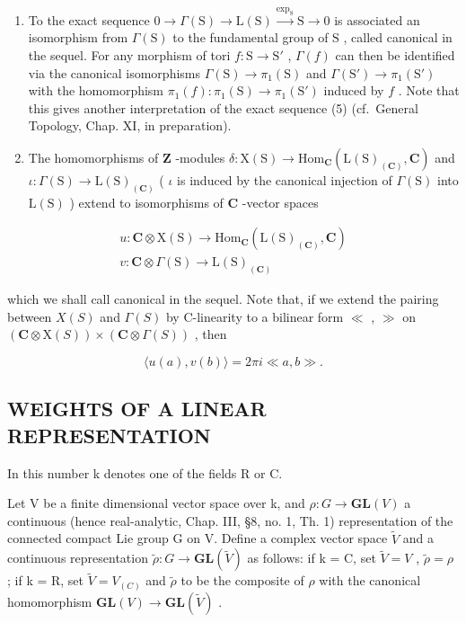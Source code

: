 \begin{enumerate}
\def\labelenumi{\arabic{enumi})}
\setcounter{enumi}{2}
\item
  To the exact sequence \(0 \to \Gamma(\mathrm{S}) \to \mathrm{L}(\mathrm{S}) \xrightarrow{\exp_{\mathrm{S}}} \mathrm{S} \to 0\) is associated an isomorphism from \(\Gamma(\mathrm{S})\) to the fundamental group of \(\mathrm{S}\) , called canonical in the sequel. For any morphism of tori \(f: \mathrm{S} \to \mathrm{S}'\) , \(\Gamma(f)\) can then be identified via the canonical isomorphisms \(\Gamma(\mathrm{S}) \to \pi_1(\mathrm{S})\) and \(\Gamma(\mathrm{S}') \to \pi_1(\mathrm{S}')\) with the homomorphism \(\pi_1(f): \pi_1(\mathrm{S}) \to \pi_1(\mathrm{S}')\) induced by \(f\) . Note that this gives another interpretation of the exact sequence (5) (cf.~General Topology, Chap. XI, in preparation).
\item
  The homomorphisms of \(\mathbf{Z}\) -modules \(\delta : \mathrm{X}(\mathrm{S}) \to \mathrm{Hom}_{\mathbf{C}}(\mathrm{L}(\mathrm{S})_{(\mathbf{C})}, \mathbf{C})\) and \(\iota : \Gamma(\mathrm{S}) \to \mathrm{L}(\mathrm{S})_{(\mathbf{C})}\) ( \(\iota\) is induced by the canonical injection of \(\Gamma(\mathrm{S})\) into \(\mathrm{L}(\mathrm{S})\) ) extend to isomorphisms of \(\mathbf{C}\) -vector spaces
\end{enumerate}

\[
\begin{array}{l} u: \mathbf {C} \otimes \mathrm{X} (\mathrm{S}) \to \mathrm{Hom} _ {\mathbf {C}} (\mathrm{L} (\mathrm{S}) _ {(\mathbf {C})}, \mathbf {C}) \\ v: \mathbf {C} \otimes \Gamma (\mathrm{S}) \to \mathrm{L} (\mathrm{S}) _ {(\mathbf {C})} \end{array}
\]

which we shall call canonical in the sequel. Note that, if we extend the pairing between \(X(S)\) and \(\Gamma(S)\) by C-linearity to a bilinear form \(\ll\) , \(\gg\) on \((\mathbf{C} \otimes \mathrm{X}(S)) \times (\mathbf{C} \otimes \Gamma(S))\) , then

\[
\langle u (a), v (b) \rangle = 2 \pi i \ll a, b \gg .
\]

\subsection{WEIGHTS OF A LINEAR REPRESENTATION}

In this number k denotes one of the fields R or C.

Let V be a finite dimensional vector space over k, and \(\rho: G \to \mathbf{GL}(V)\) a continuous (hence real-analytic, Chap. III, §8, no. 1, Th. 1) representation of the connected compact Lie group G on V. Define a complex vector space \(\tilde{V}\) and a continuous representation \(\tilde{\rho}: G \to \mathbf{GL}(\tilde{V})\) as follows: if k = C, set \(\tilde{V} = V\) , \(\tilde{\rho} = \rho\) ; if k = R, set \(\tilde{V} = V_{(C)}\) and \(\tilde{\rho}\) to be the composite of \(\rho\) with the canonical homomorphism \(\mathbf{GL}(V) \to \mathbf{GL}(\tilde{V})\) .

